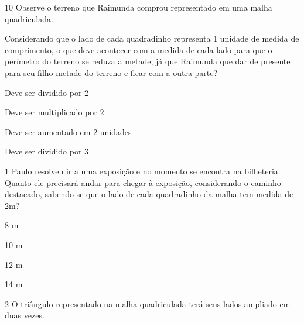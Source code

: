 \num{10} Observe o terreno que Raimunda comprou representado em uma malha
quadriculada.


Considerando que o lado de cada quadradinho representa 1 unidade de
medida de comprimento, o que deve acontecer com a medida de cada lado
para que o perímetro do terreno se reduza a metade, já que Raimunda que
dar de presente para seu filho metade do terreno e ficar com a outra
parte?

\begin{escolha}
\item
  Deve ser dividido por 2
\item
  Deve ser multiplicado por 2
\item
  Deve ser aumentado em 2 unidades
\item
  Deve ser dividido por 3
\end{escolha}



\num{1} Paulo resolveu ir a uma exposição e no momento se encontra na
bilheteria. Quanto ele precisará andar para chegar à exposição,
considerando o caminho destacado, sabendo-se que o lado de cada
quadradinho da malha tem medida de 2m?


\begin{escolha}
\item
  8 m
\item
  10 m
\item
  12 m
\item
  14 m
\end{escolha}


\num{2} O triângulo representado na malha quadriculada terá seus lados
ampliado em duas vezes.


